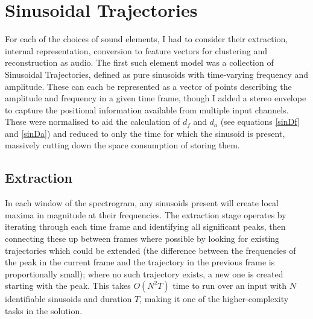 \documentclass[12pt,a4paper,twoside,openright]{report}
\begin{document}

\section{Sinusoidal Trajectories}

For each of the choices of sound elements, I had to consider their extraction, internal representation, conversion to feature vectors for clustering and reconstruction as audio. The first such element model was a collection of Sinusoidal Trajectories, defined as pure sinusoids with time-varying frequency and amplitude. These can each be represented as a vector of points describing the amplitude and frequency in a given time frame, though I added a stereo envelope to capture the positional information available from multiple input channels. These were normalised to aid the calculation of $ d_f $ and $ d_a $ (see equations \ref{sinDf} and \ref{sinDa}) and reduced to only the time for which the sinusoid is present, massively cutting down the space consumption of storing them.



\subsection{Extraction}

In each window of the spectrogram, any sinusoids present will create local maxima in magnitude at their frequencies. The extraction stage operates by iterating through each time frame and identifying all significant peaks, then connecting these up between frames where possible by looking for existing trajectories which could be extended (the difference between the frequencies of the peak in the current frame and the trajectory in the previous frame is proportionally small); where no such trajectory exists, a new one is created starting with the peak. This takes $ O(N^2T) $ time to run over an input with $ N $ identifiable sinusoids and duration $ T $, making it one of the higher-complexity tasks in the solution.
\end{document}
